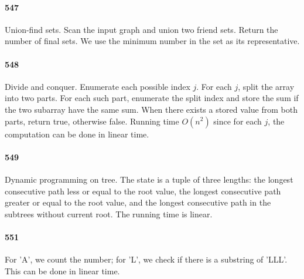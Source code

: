 \documentclass[11pt]{article}
\begin{document}
\paragraph{547}
Union-find sets. Scan the input graph and union two friend sets. Return the number of final sets. We use the minimum number
in the set as its representative. 


\paragraph{548}
Divide and conquer. Enumerate each possible index $j$. For each $j$, split the array into two parts. For each such part, 
enumerate the split index and store the sum if the two subarray have the same sum. When there exists a stored value 
from both parts, return true, otherwise false.
Running time $O(n^2)$ since for each $j$, the computation can be done in linear time.


\paragraph{549}
Dynamic programming on tree. The state is a tuple of three lengths: the longest consecutive path less or equal to the root 
value, the longest consecutive path greater or equal to the root value, and the longest consecutive path in the subtrees 
without current root. The running time is linear.

\paragraph{551}
For 'A', we count the number; for 'L', we check if there is a substring of 'LLL'. This can be done in linear time.
\end{document}
